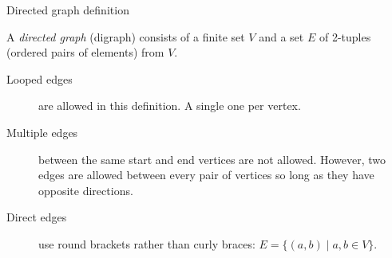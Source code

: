 \begin{frame}{Directed graph definition}
  \vspace{-4mm}
  \begin{definition}
  A \emph{directed graph} (digraph) consists of a finite set $V$ and a set $E$ of 2-tuples (ordered pairs of elements) from $V$.
  \end{definition}
  \vspace{0.2cm}
  \begin{description}
    \item[Looped edges] are allowed in this definition. A single one per vertex.
    \item[Multiple edges] between the same start and end vertices are not allowed. However, two edges are allowed between every pair of vertices so long as they have opposite directions.
    \item[Direct edges] use round brackets rather than curly braces: $E = \{ (a,b) \mid a,b \in V\}$.
  \end{description}
\end{frame}


